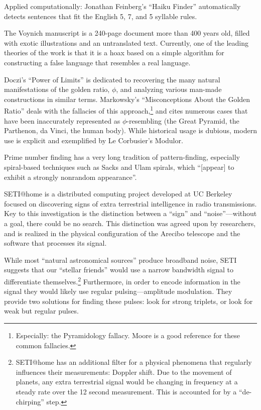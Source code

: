 \documentclass{thesis}
\begin{document}
Applied computationally: Jonathan Feinberg's ``Haiku Finder''\cite{jonathan_feinberg_haiku_????} automatically detects sentences that fit the English 5, 7, and 5 syllable rules.

The Voynich manuscript is a 240-page document more than 400 years old, filled with exotic illustrations and an untranslated text. Currently, one of the leading theories of the work is that it is a hoax based on a simple algorithm for constructing a false language that resembles a real language.\cite{robin_mckie_secret_2004}
		
Doczi's ``Power of Limits''\cite{Doczi81} is dedicated to recovering the many natural manifestations of the golden ratio, $\phi$, and analyzing various man-made constructions in similar terms. Markowsky's ``Misconceptions About the Golden Ratio''\cite{markowsky_misconceptions_1992} deals with the fallacies of this approach,\footnote{Especially: the Pyramidology fallacy. Moore\cite{Moore07} is a good reference for these common fallacies.} and cites numerous cases that have been inaccurately represented as $\phi$-resembling (the Great Pyramid, the Parthenon, da Vinci, the human body). While historical usage is dubious, modern use is explicit and exemplified by Le Corbusier's Modulor.\cite{padovan_proportion_1999}
		
Prime number finding has a very long tradition of pattern-finding, especially spiral-based techniques such as Sacks\cite{michael_m._ross_natural_2007} and Ulam\cite{weisstein_prime_????} spirals, which ``[appear] to exhibit a strongly nonrandom appearance''.
	
SETI@home\cite{seti_about_????} is a distributed computing project developed at UC Berkeley focused on discovering signs of extra terrestrial intelligence in radio transmissions. Key to this investigation is the distinction between a ``sign'' and ``noise''---without a goal, there could be no search. This distinction was agreed upon by researchers, and is realized in the physical configuration of the Arecibo telescope and the software that processes its signal.

While most ``natural astronomical sources'' produce broadband noise, SETI suggests that our ``stellar friends'' would use a narrow bandwidth signal to differentiate themselves.\footnote{SETI@home has an additional filter for a physical phenomena that regularly influences their measurements: Doppler shift. Due to the movement of planets, any extra terrestrial signal would be changing in frequency at a steady rate over the 12 second measurement. This is accounted for by a ``de-chirping'' step.} Furthermore, in order to encode information in the signal they would likely use regular pulsing---amplitude modulation. They provide two solutions for finding these pulses: look for strong triplets, or look for weak but regular pulses.
	
\end{document}

